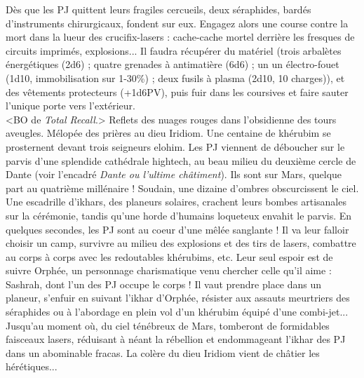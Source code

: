 \documentclass[11pt,twoside,a4paper]{book}
\begin{document}
D{\`e}s que les PJ quittent leurs fragiles cercueils, deux s{\'e}raphides, bard{\'e}s d'instruments chirurgicaux, fondent sur eux. Engagez alors une course contre la mort dans la lueur des crucifix-lasers : cache-cache mortel derri{\`e}re les fresques de circuits imprim{\'e}s, explosions... Il faudra r{\'e}cup{\'e}rer du mat{\'e}riel (trois arbal{\`e}tes {\'e}nerg{\'e}tiques (2d6) ; quatre grenades {\`a} antimati{\`e}re (6d6) ; un un {\'e}lectro-fouet (1d10, immobilisation sur 1-30\%) ; deux fusils {\`a} plasma (2d10, 10 charges)), et des v{\^e}tements protecteurs (+1d6PV), puis fuir dans les coursives et faire sauter l'unique porte vers l'ext{\'e}rieur.~\\

<BO de \emph{Total Recall}.> Reflets des nuages rouges dans l'obsidienne des tours aveugles. M{\'e}lop{\'e}e des pri{\`e}res au dieu Iridiom. Une centaine de kh{\'e}rubim se prosternent devant trois seigneurs elohim. Les PJ viennent de d{\'e}boucher sur le parvis d'une splendide cath{\'e}drale hightech, au beau milieu du deuxi{\`e}me cercle de Dante (voir l'encadr{\'e} \emph{Dante ou l'ultime ch{\^a}timent}). Ils sont sur Mars, quelque part au quatri{\`e}me mill{\'e}naire ! Soudain, une dizaine d'ombres obscurcissent le ciel. Une escadrille d'ikhars, des planeurs solaires, crachent leurs bombes artisanales sur la c{\'e}r{\'e}monie, tandis qu'une horde d'humains loqueteux envahit le parvis. En quelques secondes, les PJ sont au coeur d'une m{\^e}l{\'e}e sanglante ! Il va leur falloir choisir un camp, survivre au milieu des explosions et des tirs de lasers, combattre au corps {\`a} corps avec les redoutables kh{\'e}rubims, etc. Leur seul espoir est de suivre Orph{\'e}e, un personnage charismatique venu chercher celle qu'il aime : Sashrah, dont l'un des PJ occupe le corps ! Il vaut prendre place dans un planeur, s'enfuir en suivant l'ikhar d'Orph{\'e}e, r{\'e}sister aux assauts meurtriers des s{\'e}raphides ou {\`a} l'abordage en plein vol d'un kh{\'e}rubim {\'e}quip{\'e} d'une combi-jet... Jusqu'au moment o{\`u}, du ciel t{\'e}n{\'e}breux de Mars, tomberont de formidables faisceaux lasers, r{\'e}duisant {\`a} n{\'e}ant la r{\'e}bellion et endommageant l'ikhar des PJ dans un abominable fracas. La col{\`e}re du dieu Iridiom vient de ch{\^a}tier les h{\'e}r{\'e}tiques...~\\

\clearpage
\end{document}
